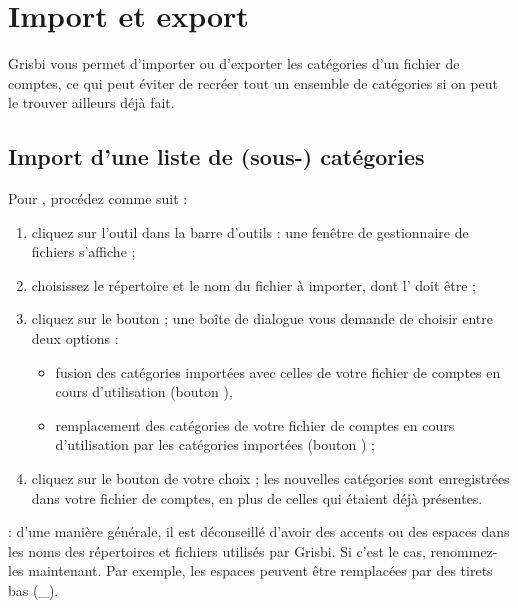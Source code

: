\section{Import et export\label{categories-importexport} }


Grisbi vous permet d'importer ou d'exporter les catégories d'un fichier de comptes, ce qui peut éviter de recréer tout un ensemble de catégories si on peut le trouver ailleurs déjà fait.


\subsection{Import d'une liste de (sous-) catégories\label{categories-importexport-import} }

Pour , procédez comme suit :

\begin{enumerate}
	 \item cliquez sur l'outil  dans la barre d'outils : une fenêtre de gestionnaire de fichiers s'affiche ;
	 \item choisissez le répertoire et le nom du fichier à importer, dont l' doit être  ;
	 \item cliquez sur le bouton  ; une boîte de dialogue vous demande de choisir entre deux options :
		    \begin{itemize}
			      \item fusion des catégories importées avec celles de votre fichier de comptes en cours d'utilisation (bouton ),
			      \item remplacement des catégories de votre fichier de comptes en cours d'utilisation par les catégories importées (bouton ) ;
		     \end{itemize}
	 \item cliquez sur le bouton de votre choix ; les nouvelles catégories sont enregistrées dans votre fichier de comptes, en plus de celles qui étaient déjà présentes.
\end{enumerate}

 : d'une manière générale, il est déconseillé d'avoir des accents ou des espaces dans les noms des répertoires et fichiers utilisés par Grisbi. Si c'est le cas, renommez-les maintenant. Par exemple, les espaces peuvent être remplacées par des tirets bas (\_).

